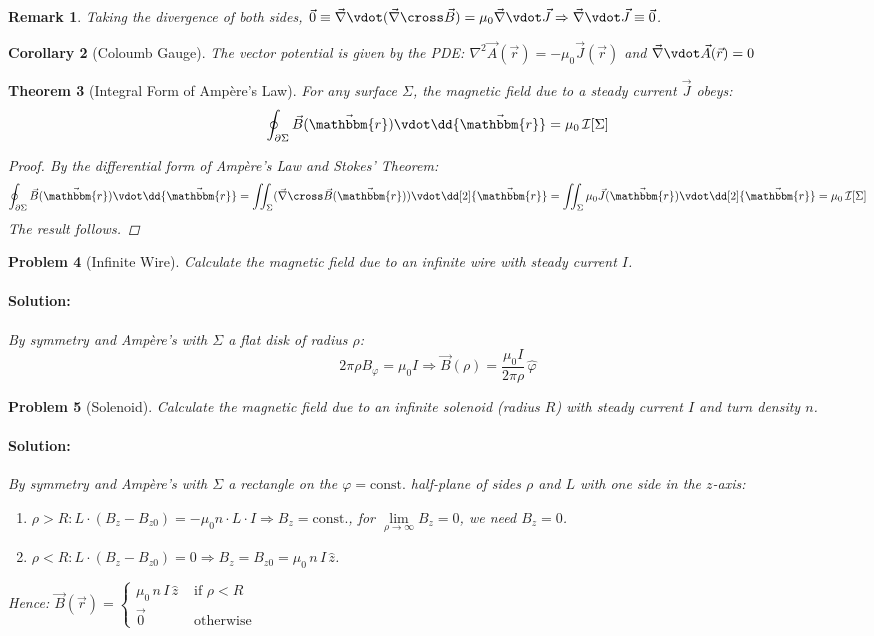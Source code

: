 \documentclass[12pt]{article}
\let\RA\Rightarrow
\renewcommand{\div}{\vec{\nabla}\vdot}
\renewcommand{\curl}{\vec{\nabla}\cross}
\newcommand*{\lapl}{\nabla^2}
\newcommand*{\rv}{\vec{r}}
\newcommand*{\irv}{\vec{\mathbbm{r}}}
\newcommand*{\vB}{\vec{B}}
\newcommand*{\vJ}{\vec{J}}
\newcommand*{\vA}{\vec{A}}
\newcommand*{\mmu}{\mu_0}
\newcommand*{\I}{\mathcal{I}}
\newtheorem{theorem}{Theorem}[subsection]
\newtheorem{corollary}[theorem]{Corollary}
\newtheorem{remark}[theorem]{Remark}
\newtheorem{problem}[theorem]{Problem}
\newenvironment{solution}{\paragraph{Solution:}}{\hfill}
\begin{document}
\begin{remark}
  Taking the divergence of both sides, $\vec{0}\equiv \div(\curl\vB)=\mmu\div\vJ\RA\div\vJ\equiv\vec{0}$.
\end{remark}

\begin{corollary}[Coloumb Gauge]
  The vector potential is given by the PDE: $\lapl\vA(\rv)=-\mmu\vJ(\rv)$ and $\div\vA(\rv)=0$
\end{corollary}

\begin{theorem}[Integral Form of Ampère's Law]
  \label{ampere_law}
  For any surface $\Sigma$, the magnetic field due to a steady current $\vJ$ obeys: $$\oint_{\partial\Sigma}\vB(\irv)\vdot \dd{\irv}=\mmu\,\I[\Sigma]$$
  \begin{proof}
    By the differential form of Ampère's Law and Stokes' Theorem: $$\oint_{\partial\Sigma}\vB(\irv)\vdot \dd{\irv}=\iint_\Sigma(\curl\vB(\irv))\vdot\dd[2]{\irv}=\iint_\Sigma\mmu\vJ(\irv)\vdot\dd[2]{\irv}=\mmu\,\I[\Sigma]$$ The result follows.
  \end{proof}
\end{theorem}

\begin{problem}[Infinite Wire]
  Calculate the magnetic field due to an infinite wire with steady current $I$.
  \begin{solution}
    By symmetry and Ampère's with $\Sigma$ a flat disk of radius $\rho$: $$2\pi \rho B_\varphi=\mmu I\RA\vB(\rho)=\dfrac{\mmu I}{2\pi \rho}\,\hat{\varphi}$$
  \end{solution}
\end{problem}

\begin{problem}[Solenoid]
  Calculate the magnetic field due to an infinite solenoid (radius $R$) with steady current $I$ and turn density $n$.
  \begin{solution}
    By symmetry and Ampère's with $\Sigma$ a rectangle on the $\varphi=\text{const.}$ half-plane of sides $\rho$ and $L$ with one side in the $z$-axis: 
    \begin{enumerate}
      \item $\rho>R: L\cdot (B_z-B_{z0})=-\mmu n\cdot L\cdot I\RA B_z=\text{const.}$, for $\lim\limits_{\rho\to\infty}B_z=0$, we need $B_z=0$.
      \item $\rho<R: L\cdot (B_z-B_{z0})=0\RA B_z=B_{z0}=\mu_0\,n\,I\,\hat{z}$.
    \end{enumerate}
    Hence: $\displaystyle \vB(\rv)=\begin{cases}
      \mu_0\,n\,I\,\hat{z} &\text{ if }\rho<R\\\vec{0}&\text{ otherwise}
    \end{cases}$
  \end{solution}
\end{problem}
\end{document}
